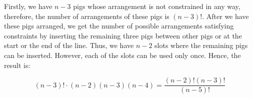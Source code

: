 \documentclass{fkssolpub}
\author{Ondřej Sedláček}
\begin{document}
Firstly, we have $n - 3$ pigs whose arrangement is not constrained in any way, therefore, the number of arrangements of these pigs is $(n - 3)!$. After we have these pigs arranged, we get the number of possible arrangements satisfying constraints by inserting the remaining three pigs between other pigs or at the start or the end of the line. Thus, we have $n - 2$ slots where the remaining pigs can be inserted. However, each of the slots can be used only once. Hence, the result is:

\[
  (n - 3)! \cdot (n - 2) (n - 3) (n - 4) = \frac{(n - 2)! (n - 3)!}{(n - 5)!}
\]
\end{document}
